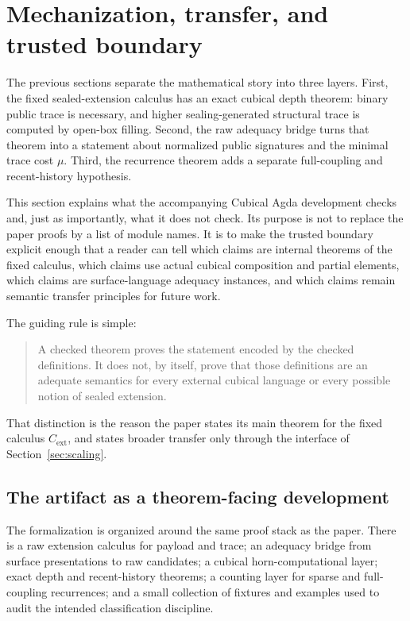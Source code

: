 
\section{Mechanization, transfer, and trusted boundary}
\label{sec:mechanization}

The previous sections separate the mathematical story into three layers.  First, the fixed
sealed-extension calculus has an exact cubical depth theorem: binary public trace is necessary,
and higher sealing-generated structural trace is computed by open-box filling.  Second, the raw
adequacy bridge turns that theorem into a statement about normalized public signatures and the
minimal trace cost \(\mu\).  Third, the recurrence theorem adds a separate full-coupling and
recent-history hypothesis.

This section explains what the accompanying Cubical Agda development checks and, just as
importantly, what it does not check.  Its purpose is not to replace the paper proofs by a list of
module names.  It is to make the trusted boundary explicit enough that a reader can tell which
claims are internal theorems of the fixed calculus, which claims use actual cubical composition
and partial elements, which claims are surface-language adequacy instances, and which claims
remain semantic transfer principles for future work.

The guiding rule is simple:
\begin{quote}
A checked theorem proves the statement encoded by the checked definitions.  It does not, by
itself, prove that those definitions are an adequate semantics for every external cubical
language or every possible notion of sealed extension.
\end{quote}
That distinction is the reason the paper states its main theorem for the fixed calculus
\(C_{\mathrm{ext}}\), and states broader transfer only through the interface of
Section~\ref{sec:scaling}.

\subsection{The artifact as a theorem-facing development}
\label{subsec:artifact-theorem-facing}

The formalization is organized around the same proof stack as the paper.  There is a raw
extension calculus for payload and trace; an adequacy bridge from surface presentations to raw
candidates; a cubical horn-computational layer; exact depth and recent-history theorems; a
counting layer for sparse and full-coupling recurrences; and a small collection of fixtures and
examples used to audit the intended classification discipline.

